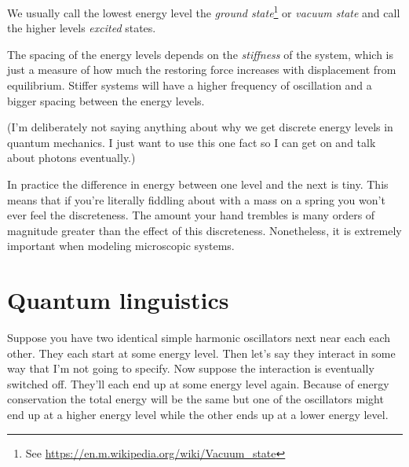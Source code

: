 \documentclass[a4paper]{article}
\begin{document}
\begin{center}
\end{center}

We usually call the lowest energy level the {\em ground state}\footnote{See \url{https://en.m.wikipedia.org/wiki/Vacuum_state}} or {\em vacuum state} and call the higher levels {\em excited} states.

The spacing of the energy levels depends on the {\em stiffness} of the system, which is just a measure of how much the restoring force increases with displacement from equilibrium. Stiffer systems will have a higher frequency of oscillation and a bigger spacing between the energy levels.

(I'm deliberately not saying anything about why we get discrete energy levels in quantum mechanics. I just want to use this one fact so I can get on and talk about photons eventually.)

In practice the difference in energy between one level and the next is tiny. This means that if you're literally fiddling about with a mass on a spring you won't ever feel the discreteness. The amount your hand trembles is many orders of magnitude greater than the effect of this discreteness. Nonetheless, it is extremely important when modeling microscopic systems.

\section{Quantum linguistics}
Suppose you have two identical simple harmonic oscillators next near each each other.
They each start at some energy level.
Then let's say they interact in some way that I'm not going to specify.
Now suppose the interaction is eventually switched off.
They'll each end up at some energy level again.
Because of energy conservation the total energy will be the same but one of the oscillators might end up at a higher energy level while the other ends up at a lower energy level.
\end{document}
